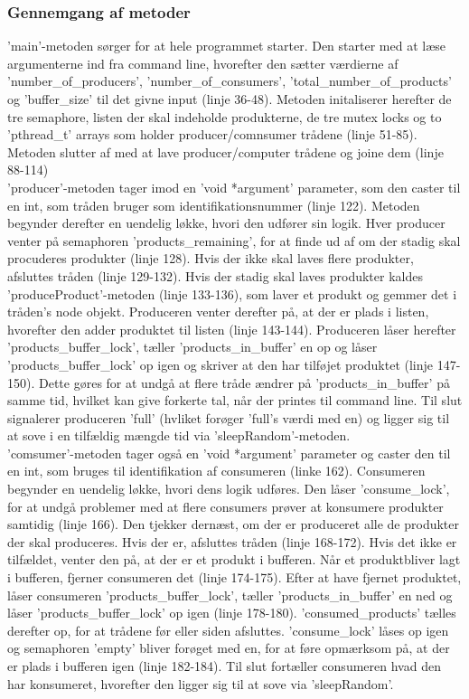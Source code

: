 \subsubsection{Gennemgang af metoder}
\label{O3_Metoder}
'main'-metoden sørger for at hele programmet starter. Den starter med at læse argumenterne ind fra command line, hvorefter den sætter værdierne af 'number_of_producers', 'number_of_consumers', 'total_number_of_products' og 'buffer_size' til det givne input (linje 36-48). Metoden initaliserer herefter de tre semaphore, listen der skal indeholde produkterne, de tre mutex locks og to 'pthread_t' arrays som holder producer/comnsumer trådene (linje 51-85). Metoden slutter af med at lave producer/computer trådene og joine dem (linje 88-114)
\\ 'producer'-metoden tager imod en 'void *argument' parameter, som den caster til en int, som tråden bruger som identifikationsnummer (linje 122). Metoden begynder derefter en uendelig løkke, hvori den udfører sin logik. Hver producer venter på semaphoren 'products_remaining', for at finde ud af om der stadig skal procuderes produkter (linje 128). Hvis der ikke skal laves flere produkter, afsluttes tråden (linje 129-132). Hvis der stadig skal laves produkter kaldes 'produceProduct'-metoden (linje 133-136), som laver et produkt og gemmer det i tråden's node objekt. Produceren venter derefter på, at der er plads i listen, hvorefter den adder produktet til listen (linje 143-144). Produceren låser herefter 'products_buffer_lock', tæller 'products_in_buffer' en op og låser 'products_buffer_lock' op igen og skriver at den har tilføjet produktet (linje 147-150). Dette gøres for at undgå at flere tråde ændrer på 'products_in_buffer' på samme tid, hvilket kan give forkerte tal, når der printes til command line. Til slut signalerer produceren 'full' (hvliket forøger 'full's værdi med en) og ligger sig til at sove i en tilfældig mængde tid via 'sleepRandom'-metoden.
\\ 'comsumer'-metoden tager også en 'void *argument' parameter og caster den til en int, som bruges til identifikation af consumeren (linke 162). Consumeren begynder en uendelig løkke, hvori dens logik udføres. Den låser 'consume_lock', for at undgå problemer med at flere consumers prøver at konsumere produkter samtidig (linje 166). Den tjekker dernæst, om der er produceret alle de produkter der skal produceres. Hvis der er, afsluttes tråden (linje 168-172). Hvis det ikke er tilfældet, venter den på, at der er et produkt i bufferen. Når et produktbliver lagt i bufferen, fjerner consumeren det (linje 174-175). Efter at have fjernet produktet, låser consumeren 'products_buffer_lock', tæller 'products_in_buffer' en ned og låser 'products_buffer_lock' op igen (linje 178-180). 'consumed_products' tælles derefter op, for at trådene før eller siden afsluttes. 'consume_lock' låses op igen og semaphoren 'empty' bliver forøget med en, for at føre opmærksom på, at der er plads i bufferen igen (linje 182-184). Til slut fortæller consumeren hvad den har konsumeret, hvorefter den ligger sig til at sove via 'sleepRandom'.
